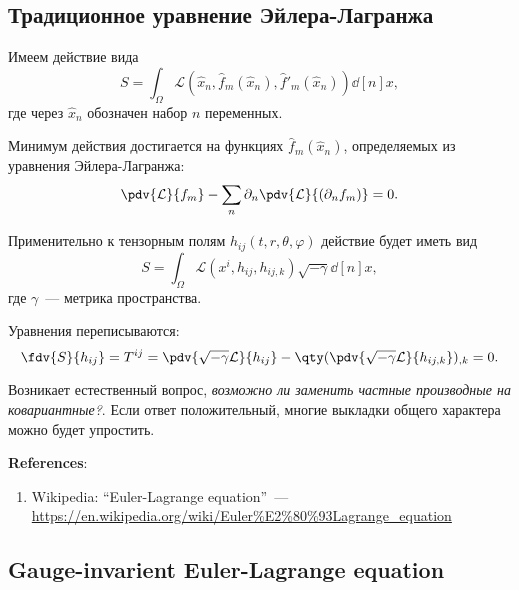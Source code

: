 \documentclass[\docroot/reports/draft/report.tex]{subfiles}
\begin{document}
\onlyinsubfile{\tableofcontents}

\subsection{Традиционное уравнение Эйлера-Лагранжа}

    Имеем действие вида
    \begin{equation}
        S = \int_\Omega \mathcal{L}(\hat{x}_n, \hat{f}_m(\hat{x}_n), \hat{f}'_m(\hat{x}_n)) \dd[n]{x} ,
    \end{equation}
    где через $\hat{x}_n$ обозначен набор $n$ переменных.

    Минимум действия достигается на функциях $\hat{f}_m(\hat{x}_n)$, определяемых из уравнения Эйлера-Лагранжа:
    \begin{equation}
        \pdv{\mathcal{L}}{f_m} - \sum\limits_n \partial_n{\pdv{\mathcal{L}}{(\partial_n{f_m})}} = 0 .
    \end{equation}

    Применительно к тензорным полям $h_{ij}(t,r,\theta,\varphi)$ действие будет иметь вид
    \begin{equation}
        S = \int_\Omega \mathcal{L}(x^i, h_{ij}, h_{ij,k}) \sqrt{-\gamma} \dd[n]{x} ,
    \end{equation}
    где $\gamma$~--- метрика пространства.

    Уравнения переписываются:
    \begin{equation}
        \fdv{S}{h_{ij}} = T^{ij} = \pdv{\sqrt{-\gamma}\mathcal{L}}{h_{ij}} - \qty(\pdv{\sqrt{-\gamma}\mathcal{L}}{h_{ij,k}})_{,k} = 0 .
    \end{equation}

    Возникает естественный вопрос, \textit{возможно ли заменить частные производные на ковариантные?}. Если ответ положительный, многие выкладки общего характера можно будет упростить.

    \vspace{1cm}

    \textbf{\Large{References}}:
    \begin{enumerate}
        \item Wikipedia: \enquote{Euler-Lagrange equation}~--- \url{https://en.wikipedia.org/wiki/Euler%E2%80%93Lagrange_equation}
    \end{enumerate}

\subsection{\foreignlanguage{english}{Gauge-invarient Euler-Lagrange equation}}
\end{document}
